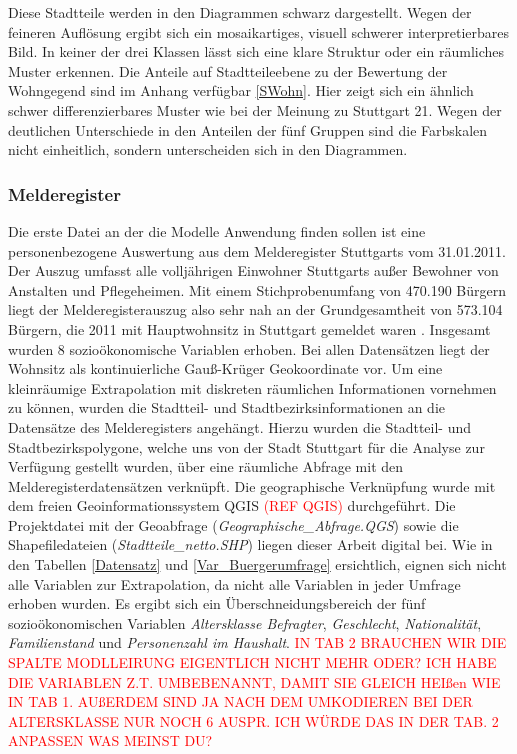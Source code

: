 \documentclass{Vorlage}
\begin{document}
Diese Stadtteile werden in den Diagrammen schwarz dargestellt. Wegen der feineren Auflösung ergibt sich ein 
mosaikartiges, visuell schwerer interpretierbares Bild. In keiner der drei Klassen lässt sich eine klare Struktur oder 
ein räumliches Muster erkennen. Die Anteile auf Stadtteileebene zu der Bewertung der Wohngegend sind im Anhang 
verfügbar \ref{SWohn}. Hier zeigt sich ein ähnlich schwer differenzierbares Muster wie bei der Meinung zu Stuttgart 21. 
Wegen der deutlichen Unterschiede in den Anteilen der fünf Gruppen sind die Farbskalen nicht einheitlich, sondern 
unterscheiden sich in den Diagrammen.\\

\subsubsection{Melderegister}
Die erste Datei an der die Modelle Anwendung finden sollen ist eine personenbezogene Auswertung aus dem Melderegister 
Stuttgarts vom 31.01.2011. Der Auszug umfasst alle volljährigen Einwohner Stuttgarts außer Bewohner von Anstalten und 
Pflegeheimen. Mit einem Stichprobenumfang von 470.190 Bürgern liegt der Melderegisterauszug also sehr nah an 
der Grundgesamtheit von 573.104 Bürgern, die 2011 mit Hauptwohnsitz in Stuttgart gemeldet waren \cite{bundesamt}. Insgesamt wurden 8 sozioökonomische Variablen erhoben. Bei allen Datensätzen liegt der Wohnsitz als 
kontinuierliche Gauß-Krüger Geokoordinate vor. Um eine kleinräumige Extrapolation mit diskreten räumlichen 
Informationen vornehmen zu können, wurden die Stadtteil- und Stadtbezirksinformationen an die Datensätze des 
Melderegisters angehängt. Hierzu wurden die Stadtteil- und Stadtbezirkspolygone, welche uns von der Stadt Stuttgart für 
die Analyse zur Verfügung gestellt wurden, über eine räumliche Abfrage mit den Melderegisterdatensätzen verknüpft. Die 
geographische Verknüpfung wurde mit dem freien Geoinformationssystem QGIS \textcolor{red}{(REF QGIS)} durchgeführt. Die 
Projektdatei mit der Geoabfrage (\textit{Geographische\_Abfrage.QGS}) sowie die Shapefiledateien 
(\textit{Stadtteile\_netto.SHP}) liegen dieser Arbeit digital bei. Wie in den Tabellen \ref{Datensatz} und 
\ref{Var_Buergerumfrage} ersichtlich, eignen sich nicht alle Variablen zur Extrapolation, da nicht alle Variablen in 
jeder Umfrage erhoben wurden. Es ergibt sich ein Überschneidungsbereich der fünf sozioökonomischen Variablen 
\textit{Altersklasse Befragter}, \textit{Geschlecht}, \textit{Nationalität}, \textit{Familienstand} und 
\textit{Personenzahl im Haushalt}. \textcolor{red}{IN TAB 2 BRAUCHEN WIR DIE SPALTE MODLLEIRUNG EIGENTLICH NICHT MEHR 
ODER? ICH HABE DIE VARIABLEN Z.T. UMBEBENANNT, DAMIT SIE GLEICH HEIßen WIE IN TAB 1. AUßERDEM SIND JA NACH DEM 
UMKODIEREN BEI DER ALTERSKLASSE NUR NOCH  6 AUSPR. ICH WÜRDE DAS IN DER TAB. 2 ANPASSEN WAS MEINST DU?}
\end{document}
